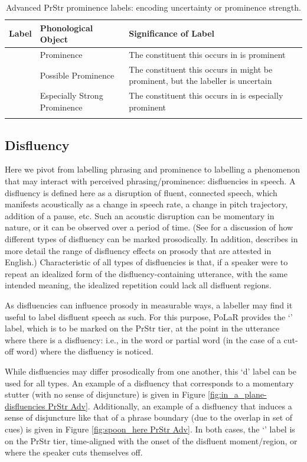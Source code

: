\documentclass[11pt, twoside]{memoir}
\def\textlabel#1{{\relsize{-.5}\fontspec[Mapping=tex-text]{Roboto Mono}{#1}}}
\begin{document}
\begin{longtable}{clp{.5\linewidth}} \toprule \textbf{Label} & \textbf{Phonological Object} & \textbf{Significance of Label}\tabularnewline
\midrule \endhead
\rowcolor{green}
\textlabel{*} & Prominence & The constituent this occurs in is prominent\tabularnewline
\textlabel{?*} & Possible Prominence & The constituent this occurs in might be prominent, but the labeller is uncertain \tabularnewline
\textlabel{**} & Especially Strong Prominence & The constituent this occurs in is especially prominent \tabularnewline
%
\bottomrule
\caption{Advanced PrStr prominence labels: encoding uncertainty or prominence strength.}
\end{longtable}

\subsection{Disfluency}\label{sec:disfluency}

Here we pivot from labelling phrasing and prominence to labelling a phenomenon that may interact with perceived phrasing\slash prominence: disfluencies in speech. A disfluency is defined here as a disruption of fluent, connected speech, which manifests acoustically as a change in speech rate, a change in pitch trajectory, addition of a pause, etc. Such an acoustic disruption can be momentary in nature, or it can be observed over a period of time. (See \citealt{shattuck-hufnagelcutler99} for a discussion of how different types of disfluency can be marked prosodically. In addition, \citealt{brugos-19} describes in more detail the range of disfluency effects on prosody that are attested in English.) Characteristic of all types of disfluencies is that, if a speaker were to repeat an idealized form of the disfluency-containing utterance, with the same intended meaning, the idealized repetition could lack all disfluent regions.

As disfluencies can influence prosody in measurable ways, a labeller may find it useful to label disfluent speech as such. For this purpose, PoLaR provides the ‘\textlabel{d}’ label, which is to be marked on the PrStr tier, at the point in the utterance where there is a disfluency: i.e., in the word or partial word (in the case of a cut-off word) where the disfluency is noticed.

While disfluencies may differ prosodically from one another, this ‘d’ label can be used for all types. An example of a disfluency that corresponds to a momentary stutter (with no sense of disjuncture) is given in Figure \ref{fig:in_a_plane-disfluencies PrStr Adv}. Additionally, an example of a disfluency that induces a sense of disjuncture like that of a phrase boundary (due to the overlap in set of cues) is given in Figure \ref{fig:spoon_here PrStr Adv}. In both cases, the ‘\textlabel{d}’ label is on the PrStr tier, time-aligned with the onset of the disfluent moment\slash region, or where the speaker cuts themselves off.
\end{document}
